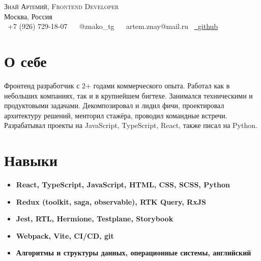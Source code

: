 \documentclass[letterpaper,12pt]{article}
\newcommand{\resumeSubHeadingListStart}{\begin{itemize}[leftmargin=*]}
\newcommand{\resumeSubHeadingListEnd}{\end{itemize}}
\begin{document}
\begin{center}
    {\huge \scshape Знай Артемий, Frontend Developer}
    \\ \vspace{1pt}
    Москва, Россия 
    \\ \vspace{6pt}
    \small \raisebox{-0.1\height}\faPhone\ +7 (926) 729-18-07 ~ 
    \raisebox{-0.1\height}\faPaperPlane\ {@znako\_tg} ~ 
    \raisebox{-0.1\height}\faEnvelope\  artem.znay@mail.ru~ 
    \href{https://github.com/znako}{\raisebox{-0.2\height}\faGithub\ \underline{github}} ~
    \vspace{-8pt}
\end{center}

\vspace{4pt}

\section{О себе}
    Фронтенд разработчик с 2+ годами коммерческого опыта. Работал как в небольших компаниях, так и в крупнейшем бигтехе. Занимался техническими и продуктовыми задачами. Декомпозировал и лидил фичи, проектировал архитектуру решений,  менторил стажёра, проводил командные встречи. Разрабатывал проекты на JavaScript, TypeScript, React, также писал на Python.

\vspace{4pt}

\section{Навыки}
 \resumeSubHeadingListStart
   \item{
     \textbf{\textbf{React, TypeScript, JavaScript, HTML, CSS, SCSS, Python} }
   }\vspace{-7pt}
   \item{
     \textbf{\textbf{Redux (toolkit, saga, observable), RTK Query, RxJS} }
   }\vspace{-7pt}
   \item{
     \textbf{Jest, RTL, Hermione, Testplane, Storybook}
   }\vspace{-7pt}
   \item{
     \textbf{Webpack, Vite, CI/CD, git}
   }\vspace{-7pt}
   \item{
     \textbf{Алгоритмы и структуры данных, операционные системы, английский}
   }
 \resumeSubHeadingListEnd
\end{document}
